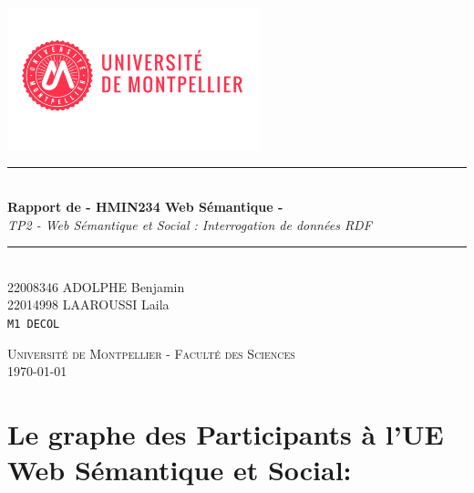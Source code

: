 \documentclass[12pt,a4paper]{article}
\newcommand{\HRule}{\rule{\linewidth}{0.5mm}}
\begin{document}
    \renewcommand{\abstractname}{Un résume}
    \renewcommand{\contentsname}{Table des matières}
    \renewcommand{\refname}{Table de références}

    \begin{titlepage}
        \begin{center}

            \includegraphics[width=0.55\textwidth]{universite_Montpellier_.jpg}~\\[2cm]


            \HRule \\[0.4cm]
            { \LARGE
            \textbf{Rapport de - HMIN234 Web Sémantique -}\\[0.4cm]
            \emph{TP2 - Web Sémantique et Social : Interrogation de données RDF}\\[0.4cm]
            }
            \HRule \\[1.5cm]


            { \large
            22008346 ADOLPHE Benjamin  \\[0.1cm]
            22014998 LAAROUSSI Laila\\[0.1cm]
            \texttt{M1 DECOL}
            }

            \vfill

            \textsc{\large Université de Montpellier - Faculté des Sciences}\\[0.4cm]


            {\large {}\today}

        \end{center}
    \end{titlepage}
    \newpage
    \setcounter{page}{1}



    \section{Le graphe des Participants à l'UE Web Sémantique et Social:}
\end{document}

